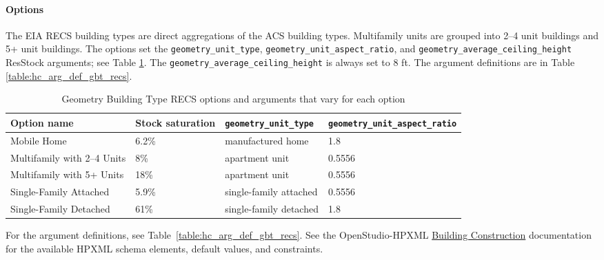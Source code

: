\paragraph{Options}
The EIA RECS building types are direct aggregations of the ACS building types. Multifamily units are grouped into 2--4 unit buildings and 5+ unit buildings. The options set the \texttt{geometry\_unit\_type}, \texttt{geometry\_unit\_aspect\_ratio}, and \texttt{geometry\_average\_ceiling\_height} ResStock arguments; see Table \ref{table:hc_opt_gbt_recs}. The \texttt{geometry\_average\_ceiling\_height} is always set to 8 ft. The argument definitions are in Table \ref{table:hc_arg_def_gbt_recs}.

\begin{longtable}[]{ |p{}|p{2cm}|p{4cm}|p{3cm}| }
\caption{Geometry Building Type RECS options and arguments that vary for each option} \label{table:hc_opt_gbt_recs} \\
\toprule\noalign{}
Option name & Stock saturation & \texttt{geometry\_unit\_type} &
\texttt{geometry\_unit\_aspect\_ratio} \\
\midrule\noalign{}
\endhead
\bottomrule\noalign{}
\endlastfoot
Mobile Home & 6.2\% & manufactured home & 1.8\\
Multifamily with 2--4 Units & 8\% & apartment unit & 0.5556\\
Multifamily with 5+ Units & 18\% & apartment unit & 0.5556 \\
Single-Family Attached & 5.9\% & single-family attached & 0.5556\\
Single-Family Detached & 61\% & single-family detached & 1.8 \\
\end{longtable}

For the argument definitions, see Table~\ref{table:hc_arg_def_gbt_recs}. See the OpenStudio-HPXML \href{https://openstudio-hpxml.readthedocs.io/en/v1.8.1/workflow_inputs.html#hpxml-building-construction}{Building Construction} documentation for the available HPXML schema elements, default values, and constraints.

